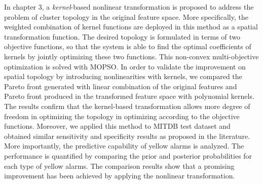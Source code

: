 In chapter 3, a \textit{kernel}-based nonlinear transformation is proposed to address the problem of cluster topology in the original feature space. More specifically, the weighted combination of kernel functions are deployed in this method as a spatial transformation function. The desired topology is formulated in terms of two objective functions, so that the system is able to find the optimal coefficients of kernels by jointly optimizing these two functions. This non-convex multi-objective optimization is solved with MOPSO. In order to validate the improvement on spatial topology by introducing nonlinearities with kernels, we compared the Pareto front generated with linear combination of the original features and Pareto front produced in the transformed feature space with polynomial kernels. The results confirm that the kernel-based transformation allows more degree of freedom in optimizing the topology in optimizing according to the objective functions. Moreover, we applied this method to MITDB test dataset and obtained similar sensitivity and specificity results as proposed in the literature. More importantly, the predictive capability of yellow alarms is analyzed. The performance is quantified by comparing the prior and posterior probabilities for each type of yellow alarms. The comparison results show that a promising improvement has been achieved by applying the nonlinear transformation. 

